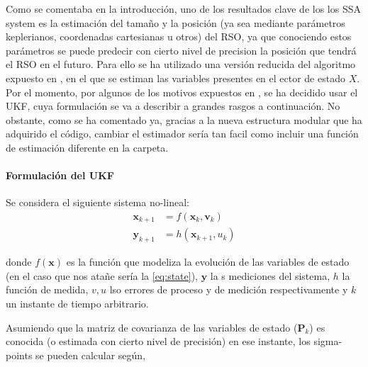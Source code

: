 Como se comentaba en la introducción, uno de los resultados clave de los los SSA system es la estimación del tamaño y la posición (ya sea mediante parámetros keplerianos, coordenadas cartesianas u otros) del RSO, ya que conociendo estos parámetros se puede predecir  con cierto nivel de precision la posición que tendrá el RSO en el futuro. Para ello se ha utilizado una versión reducida del algoritmo expuesto en \cite{linares}, en el que se estiman las variables presentes en el ector de estado $X$. 
Por el momento, por algunos de los motivos expuestos en \cite{UKFvsEKF}, se ha decidido usar el UKF, cuya formulación se va a describir a grandes rasgos a continuación. No obstante, como se ha comentado ya, gracias a la nueva estructura modular que ha adquirido el código, cambiar el estimador sería tan facil como incluir una función de estimación diferente en la carpeta.

\paragraph{Formulación del UKF}
Se considera el siguiente sistema no-lineal:
\begin{equation}\begin{aligned}\boldsymbol{x}_{k+1}&=f(\boldsymbol{x}_k,\boldsymbol{v}_k)\\\boldsymbol{y}_{k+1}&=h(\boldsymbol{x}_{k+1},u_k)\end{aligned}\end{equation}
 
donde $f(\boldsymbol{x})$ es la función que modeliza la evolución de las variables de estado (en el caso que nos atañe sería la \autoref{eq:state}),  $\boldsymbol{y}$ la s mediciones del sistema, $h$ la función de medida, $v, u$ lso errores de proceso y de medición respectivamente y $k$ un instante de tiempo arbitrario.

Asumiendo que la matriz de covarianza de las variables de estado ($\boldsymbol{P}_k$) es conocida (o estimada con cierto nivel de precisión) en ese instante, los sigma-points se  pueden calcular según,

